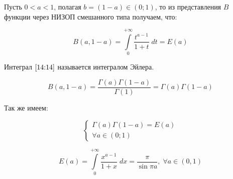 \documentclass[../../main.tex]{subfiles}
\begin{document}
	Пусть $0 < a < 1$, полагая $b = (1-a) \in (0;1)$, то из представления $B$ 
	функции через НИЗОП смешанного типа получаем, что:
	
	\begin{equation}
	\label{14:14}
	B\left( a,1-a\right) = \int\limits_{0}^{+\infty} \frac{t^{a-1}}{1+t} \; dt = 
	E(a)
	\end{equation}
	
	Интеграл $\eqref{14:14}$ называется интегралом Эйлера.
	
	\[  B\left( a,1-a\right)  = \frac{\Gamma(a) \Gamma(1-a) }{\Gamma(1)} = 
	\Gamma(a) \Gamma(1-a) \]
	
	Так же имеем:
	
	\begin{equation}
	\label{14:15}
	\begin{cases}
	\Gamma(a) \Gamma(1-a) = E(a)  \\
	\forall a \in (0;1)
	\end{cases}
	\end{equation}
	
	\begin{thm}
		\begin{equation}
		\label{14:16}
		E(a) = \int\limits_{0}^{+\infty} \frac{x^{a-1}}{1+x} \; dx = 
		\frac{\pi}{\sin{\pi a}}, \; \forall a \in(0,1)
		\end{equation}
		
	\end{thm}
\end{document}
